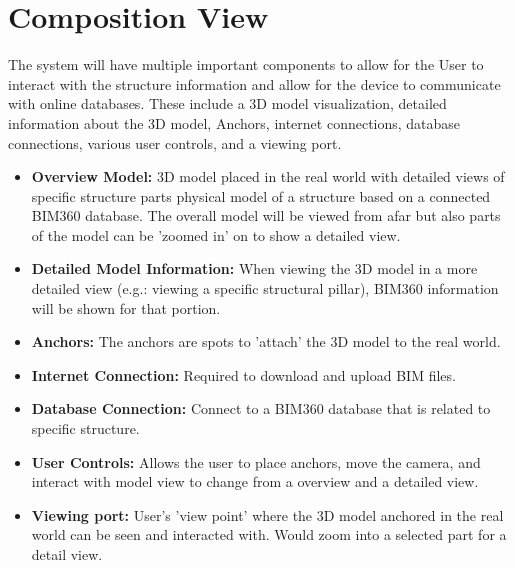 \documentclass[onecolumn, draftclsnofoot,10pt, compsoc]{IEEEtran}
\begin{document}
\section{Composition View}
The system will have multiple important components to allow for the User to interact with the structure information and allow for the device to communicate with online databases. These include a 3D model visualization, detailed information about the 3D model, Anchors, internet connections, database connections, various user controls, and a viewing port.
\begin{itemize}
    \item \textbf{Overview Model:} 3D model placed in the real world with detailed views of specific structure parts physical model of a structure based on a connected BIM360 database. The overall model will be viewed from afar but also parts of the model can be 'zoomed in' on to show a detailed view.
    \item \textbf{Detailed Model Information:} When viewing the 3D model in a more detailed view (e.g.: viewing a specific structural pillar), BIM360 information will be shown for that portion.
    \item \textbf{Anchors:} The anchors are spots to 'attach' the 3D model to the real world.
    \item \textbf{Internet Connection:} Required to download and upload BIM files.
    \item \textbf{Database Connection:} Connect to a BIM360 database that is related to specific structure.
    \item \textbf{User Controls:} Allows the user to place anchors, move the camera, and interact with model view to change from a overview and a detailed view.
    \item \textbf{Viewing port:} User's 'view point' where the 3D model anchored in the real world can be seen and interacted with. Would zoom into a selected part for a detail view.
\end{itemize}
\end{document}
